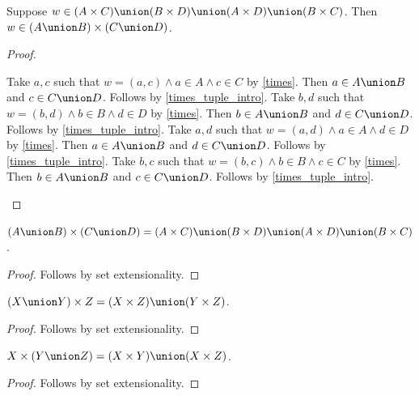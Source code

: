 \begin{proposition}\label{union_times_elim}
    Suppose $w\in(A\times C)\union (B\times D)\union (A\times D)\union (B\times C)$.
    Then $w\in(A\union B)\times (C\union D)$.
\end{proposition}
\begin{proof}
    \begin{byCase}
            Take $a, c$ such that $w = (a, c) \land a\in A\land c\in C$ by \cref{times}.
            Then $a\in A\union B$ and $c\in C\union D$.
            Follows by \cref{times_tuple_intro}.
            Take $b, d$ such that $w = (b, d) \land b\in B\land d\in D$ by \cref{times}.
            Then $b\in A\union B$ and $d\in C\union D$.
            Follows by \cref{times_tuple_intro}.
            Take $a, d$ such that $w = (a, d) \land a\in A\land d\in D$ by \cref{times}.
            Then $a\in A\union B$ and $d\in C\union D$.
            Follows by \cref{times_tuple_intro}.
            Take $b, c$ such that $w = (b, c) \land b\in B\land c\in C$ by \cref{times}.
            Then $b\in A\union B$ and $c\in C\union D$.
            Follows by \cref{times_tuple_intro}.
    \end{byCase}
\end{proof}

\begin{proposition}\label{union_times}
    $(A\union B)\times (C\union D) = (A\times C)\union (B\times D)\union (A\times D)\union (B\times C)$.
\end{proposition}
\begin{proof}
    Follows by set extensionality.
\end{proof}

\begin{proposition}\label{union_times_left}
    $(X\union Y)\times Z = (X\times Z)\union (Y\times Z)$.
\end{proposition}
\begin{proof}
    Follows by set extensionality.
\end{proof}

\begin{proposition}\label{union_times_right}
    $X\times (Y\union Z) = (X\times Y)\union (X\times Z)$.
\end{proposition}
\begin{proof}
    Follows by set extensionality.
\end{proof}
